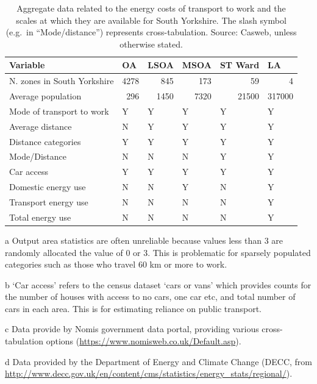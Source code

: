 \documentclass[a4paper, 11pt, twoside]{Thesis}
\begin{document}
\begin{table}[htbp]
\begin{threeparttable}
\caption[Aggregate data on energy costs of commuting by
scale]{Aggregate data related to the energy costs of transport to
work and the scales at which they are available for South
Yorkshire. The slash symbol (e.g.~in ``Mode/distance'')
represents cross-tabulation. Source: Casweb, unless otherwise stated.}

\begin{tabular}{|l|l|l|l|l|l|}
\hline
Variable & OA & LSOA & MSOA & ST Ward & LA \\ \hline
N. zones in South Yorkshire & \multicolumn{1}{r|}{4278} &
\multicolumn{1}{r|}{845} &
\multicolumn{1}{r|}{173} & \multicolumn{1}{r|}{59} & \multicolumn{1}{r|}{4} \\

Average population & \multicolumn{1}{r|}{296} & \multicolumn{1}{r|}{1450} &
\multicolumn{1}{r|}{7320} & \multicolumn{1}{r|}{21500} &
\multicolumn{1}{r|}{317000} \\
Mode of transport to work & Y\tnote{a} & Y & Y & Y & Y \\
Average distance & N & Y & Y & Y & Y \\
Distance categories & Y\tnote{a} & Y \tnote{c} & Y\tnote{c} & Y & Y \\
Mode/Distance & N & N & N & Y & Y \\
Car access\tnote{b} & Y & Y & Y & Y & Y \\
Domestic energy use\tnote{d} & N & N & Y & N & Y \\
Transport energy use\tnote{d} & N & N & N & N & Y \\
Total energy use\tnote{d} & N & N & N & N & Y \\ \hline
\end{tabular}
\begin{tablenotes}
\begin{footnotesize}
 \item [a] Output area statistics are often unreliable because values less than
3 are randomly allocated the value of 0 or 3. This is problematic for sparsely
populated categories such as those who travel 60 km or more to work.
\item [b] `Car access' refers to the census dataset `cars or vans' which
provides counts for the number of houses with access to no cars, one car etc,
and total number of cars in each area. This is for estimating reliance on
public transport.
\item [c] Data provide by Nomis government data portal, providing various
cross-tabulation options (\url{https://www.nomisweb.co.uk/Default.asp}).
\item [d] Data provided by the Department of Energy and Climate Change (DECC,
from
\url{http://www.decc.gov.uk/en/content/cms/statistics/energy_stats/regional/}).
\end{footnotesize}
\end{tablenotes}
\label{t:agdata}
\end{threeparttable}
\end{table}
\end{document}
